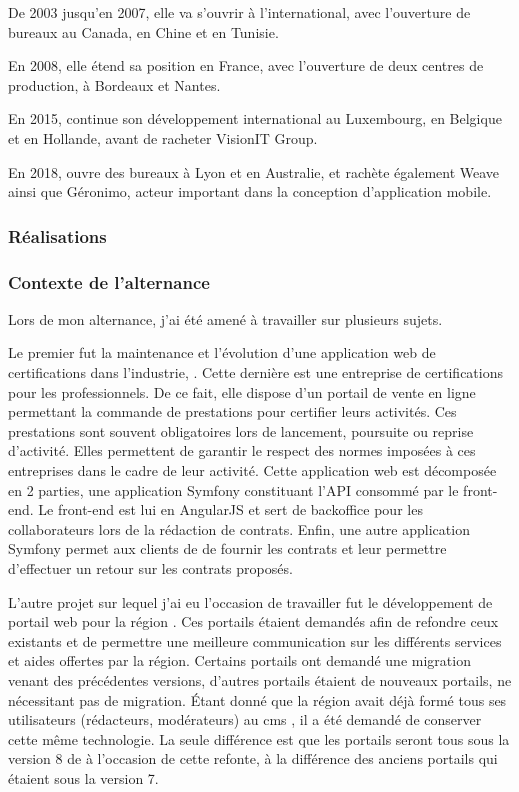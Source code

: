 De 2003 jusqu'en 2007, elle va s'ouvrir à l'international, avec l'ouverture de bureaux au Canada, en Chine et en Tunisie.

En 2008, elle étend sa position en France, avec l'ouverture de deux centres de production, à Bordeaux et Nantes.

En 2015, \onepoint{} continue son développement international au Luxembourg, en Belgique et en Hollande, avant de racheter VisionIT Group.

En 2018, \onepoint{} ouvre des bureaux à Lyon et en Australie, et rachète également Weave ainsi que Géronimo, acteur important dans la conception d'application mobile.

\subsubsection{Réalisations}


\subsubsection{Contexte de l'alternance}

Lors de mon alternance, j'ai été amené à travailler sur plusieurs sujets.

Le premier fut la maintenance et l'évolution d'une application web de certifications dans l'industrie, \bv. Cette dernière est une entreprise de certifications pour les professionnels. De ce fait, elle dispose d’un portail de vente en ligne permettant la commande de prestations pour certifier leurs activités. Ces prestations sont souvent obligatoires lors de lancement, poursuite ou reprise d'activité. Elles permettent de garantir le respect des normes imposées à ces entreprises dans le cadre de leur activité. Cette application web est décomposée en 2 parties, une application Symfony constituant l'API consommé par le front-end. Le front-end est lui en AngularJS et sert de backoffice pour les collaborateurs \bv{} lors de la rédaction de contrats. Enfin, une autre application Symfony permet aux clients de \bv{} de fournir les contrats et leur permettre d'effectuer un retour sur les contrats proposés.

L'autre projet sur lequel j'ai eu l'occasion de travailler fut le développement de portail web pour la région \naq{}. Ces portails étaient demandés afin de refondre ceux existants et de permettre une meilleure communication sur les différents services et aides offertes par la région. Certains portails ont demandé une migration venant des précédentes versions, d'autres portails étaient de nouveaux portails, ne nécessitant pas de migration. Étant donné que la région avait déjà formé tous ses utilisateurs (rédacteurs, modérateurs) au \gls{cms} \drupal, il a été demandé de conserver cette même technologie. La seule différence est que les portails seront tous sous la version 8 de \drupal{} à l'occasion de cette refonte, à la différence des anciens portails qui étaient sous la version 7.

